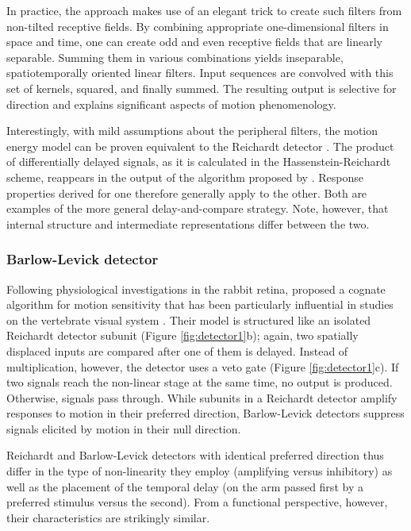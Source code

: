 In practice, the approach makes use of an elegant trick to create such filters from non-tilted receptive fields. By combining appropriate one-dimensional filters in space and time, one can create odd and even receptive fields that are linearly separable. Summing them in various combinations yields inseparable, spatiotemporally oriented linear filters. Input sequences are convolved with this set of kernels, squared, and finally summed. The resulting output is selective for direction and explains significant aspects of motion phenomenology.

Interestingly, with mild assumptions about the peripheral filters, the motion energy model can be proven equivalent to the Reichardt detector \citep{vanSanten:1985ug}. The product of differentially delayed signals, as it is calculated in the Hassenstein-Reichardt scheme, reappears in the output of the algorithm proposed by \citet{Adelson:1985tx}. Response properties derived for one therefore generally apply to the other. Both are examples of the more general delay-and-compare strategy. Note, however, that internal structure and intermediate representations differ between the two.

\subsubsection{Barlow-Levick detector}
Following physiological investigations in the rabbit retina, \citet{Barlow:1965aa} proposed a cognate algorithm for motion sensitivity that has been particularly influential in studies on the vertebrate visual system \citep{Borst:2015ko}. Their model is structured like an isolated Reichardt detector subunit (Figure \ref{fig:detector1}b); again, two spatially displaced inputs are compared after one of them is delayed. Instead of multiplication, however, the detector uses a veto gate (Figure \ref{fig:detector1}c). If two signals reach the non-linear stage at the same time, no output is produced. Otherwise, signals pass through. While subunits in a Reichardt detector amplify responses to motion in their preferred direction, Barlow-Levick detectors suppress signals elicited by motion in their null direction. 

Reichardt and Barlow-Levick detectors with identical preferred direction thus differ in the type of non-linearity they employ (amplifying versus inhibitory) as well as the placement of the temporal delay (on the arm passed first by a preferred stimulus versus the second). From a functional perspective, however, their characteristics are strikingly similar.

